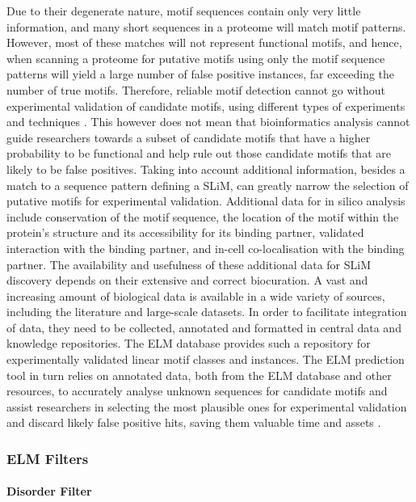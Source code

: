 \documentclass[12pt]{article}
\begin{document}
Due to their degenerate nature, motif sequences contain only very little
information, and many short sequences in a proteome will match motif patterns.
However, most of these matches will not represent functional motifs, and hence,
when scanning a proteome for putative motifs using only the motif sequence
patterns will yield a large number of false positive instances, far exceeding
the number of true motifs. Therefore, reliable motif detection cannot go without
experimental validation of candidate motifs, using different types of
experiments and techniques \citep{26581338}. This however does not mean that
bioinformatics analysis cannot guide researchers towards a subset of candidate
motifs that have a higher probability to be functional and help rule out those
candidate motifs that are likely to be false positives. Taking into account
additional information, besides a match to a sequence pattern defining a SLiM,
can greatly narrow the selection of putative motifs for experimental validation.
Additional data for in silico analysis include conservation of the motif
sequence, the location of the motif within the protein's structure and its
accessibility for its binding partner, validated interaction with the binding
partner, and in-cell co-localisation with the binding partner. The availability
and usefulness of these additional data for SLiM discovery depends on their
extensive and correct biocuration. A vast and increasing amount of biological
data is available in a wide variety of sources, including the literature and
large-scale datasets. In order to facilitate integration of data, they need to
be collected, annotated and formatted in central data and knowledge
repositories. The ELM database provides such a repository for experimentally
validated linear motif classes and instances. The ELM prediction tool in turn
relies on annotated data, both from the ELM database and other resources, to
accurately analyse unknown sequences for candidate motifs and assist researchers
in selecting the most plausible ones for experimental validation and discard
likely false positive hits, saving them valuable time and assets
\citep{22110040}.

\subsubsection*{ELM Filters}

\paragraph*{Disorder Filter}\label{DisorderFilter}
\end{document}
